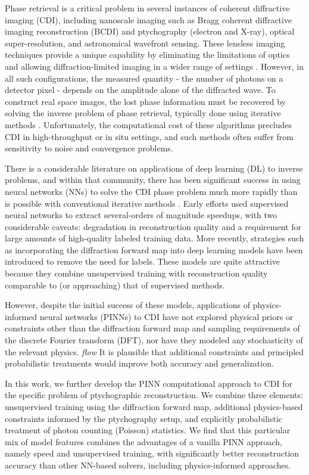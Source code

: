 \documentclass[sn-mathphys]{sn-jnl}%
\theoremstyle{thmstyleone}%
\theoremstyle{thmstyletwo}%
\theoremstyle{thmstylethree}%
\begin{document}
Phase retrieval is a critical problem in several instances of coherent diffractive imaging (CDI), including nanoscale imaging such as Bragg coherent diffractive imaging reconstruction (BCDI) and ptychography (electron and X-ray), optical super-resolution, and astronomical wavefront sensing. These lensless imaging techniques provide a unique capability by eliminating the limitations of optics and allowing diffraction-limited imaging in a wider range of settings \cite{dean2006phase, heintzmann2021answers, miao2015beyond}. However, in all such configurations, the measured quantity - the number of photons on a detector pixel - depends on the amplitude alone of the diffracted wave. To construct real space images, the lost phase information must be recovered by solving the inverse problem of phase retrieval, typically done using iterative methods \cite{epie}. Unfortunately, the computational cost of these algorithms precludes CDI in high-throughput or in situ settings, and such methods often suffer from sensitivity to noise and convergence problems.

There is a considerable literature on applications of deep learning (DL) to inverse problems, and within that community, there has been significant success in using neural networks (NNs) to solve the CDI phase problem much more rapidly than is possible with conventional iterative methods \cite{ratner2021recovering,yao2022autophasenn}. Early efforts used supervised neural networks to extract several-orders of magnitude speedups, with two considerable caveats: degradation in reconstruction quality and a requirement for large amounts of high-quality labeled training data. More recently, strategies such as incorporating the diffraction forward map into deep learning models have been introduced to remove the need for labels. These models are quite attractive because they combine unsupervised training with reconstruction quality comparable to (or approaching) that of supervised methods.

However, despite the initial success of these models, applications of physics-informed neural networks (PINNs) to CDI have not explored physical priors or constraints other than the diffraction forward map and sampling requirements of the discrete Fourier transform (DFT), nor have they modeled any stochasticity of the relevant physics. \emph{flow} It is plausible that additional constraints and principled probabilistic treatments would improve both accuracy and generalization.

In this work, we further develop the PINN computational approach to CDI for the specific problem of ptychographic reconstruction. We combine three elements: unsupervised training using the diffraction forward map, additional physics-based constraints informed by the ptychography setup, and explicitly probabilistic treatment of photon counting (Poisson) statistics. We find that this particular mix of model features combines the advantages of a vanilla PINN approach, namely speed and unsupervised training, with significantly better reconstruction accuracy than other NN-based solvers, including physics-informed approaches.
\end{document}
